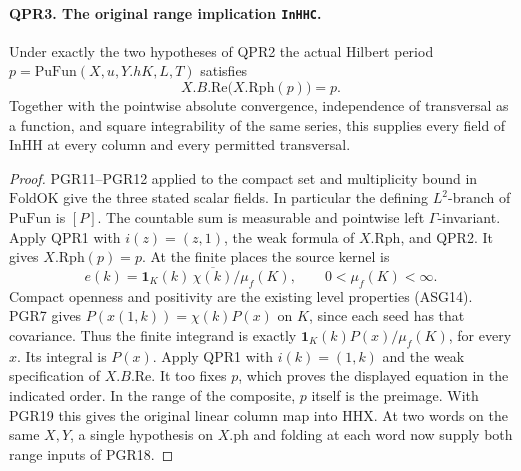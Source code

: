 \paragraph{QPR3. The original range implication \texttt{InHHC}.}
Under exactly the two hypotheses of QPR2 the actual Hilbert period
\(p=\mathrm{PuFun}(X,u,Y.hK,L,T)\) satisfies
\[
       X.B.\mathrm{Re}\bigl(X.\mathrm{Rph}(p)\bigr)=p .
\]
Together with the pointwise absolute convergence, independence of
transversal as a function, and square integrability of the same
series, this supplies every field of \(\mathrm{InHH}\) at every
column and every permitted transversal.
\begin{proof}
PGR11--PGR12 applied to the compact set and multiplicity bound in
\(\mathrm{FoldOK}\) give the three stated scalar fields. In particular
the defining \(L^2\)-branch of \(\mathrm{PuFun}\) is \([P]\).
The countable sum is measurable and pointwise left
\(\Gamma\)-invariant. Apply QPR1 with \(i(z)=(z,1)\), the weak
formula of \(X.\mathrm{Rph}\), and QPR2. It gives
\(X.\mathrm{Rph}(p)=p\). At the finite places the source kernel is
\[
 e(k)=\mathbf1_K(k)\,\overline{\chi(k)}/\mu_f(K),
 \qquad 0<\mu_f(K)<\infty .
\]
Compact openness and positivity are the existing level properties
(ASG14). PGR7 gives \(P(x(1,k))=\chi(k)P(x)\) on \(K\), since each
seed has that covariance. Thus the finite integrand is exactly
\(\mathbf1_K(k)P(x)/\mu_f(K)\), for every \(x\). Its integral is
\(P(x)\). Apply QPR1 with \(i(k)=(1,k)\) and the weak specification
of \(X.B.\mathrm{Re}\). It too fixes \(p\), which proves the
displayed equation in the indicated order. In the range of the
composite, \(p\) itself is the preimage. With PGR19 this gives the
original linear column map into \(\mathrm{HHX}\). At two words on the
same \(X,Y\), a single hypothesis on \(X.\mathrm{ph}\) and folding
at each word now supply both range inputs of PGR18.
\end{proof}

